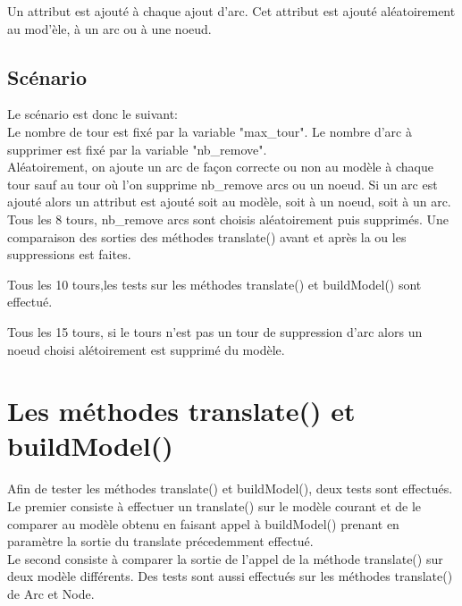 \documentclass{article}
\begin{document}
Un attribut est ajout\'e \`a chaque ajout d'arc.
Cet attribut est ajout\'e al\'eatoirement au mod'\`ele, \`a un arc ou \`a une noeud. 


\subsection{Sc\'enario}

Le sc\'enario est donc le suivant:\\

Le nombre de tour est fix\'e par la variable "max\_tour".
Le nombre d'arc \`a supprimer est fix\'e par la variable "nb\_remove".\\

Al\'eatoirement, on ajoute un arc de fa\c{c}on correcte ou non au mod\`ele \`a chaque tour sauf au tour 
o\`u l'on supprime nb\_remove arcs ou un noeud.
Si un arc est ajout\'e alors un attribut est ajout\'e soit au mod\`ele, soit \`a un noeud, soit \`a un arc.\\

Tous les 8 tours, nb\_remove arcs sont choisis al\'eatoirement puis supprim\'es.
Une comparaison des sorties des m\'ethodes translate() avant et apr\`es la ou les suppressions 
est faites.

Tous les 10 tours,les tests sur les m\'ethodes translate() et buildModel() sont effectu\'e.

Tous les 15 tours, si le tours n'est pas un tour de suppression d'arc alors un noeud choisi al\'etoirement est supprim\'e du mod\`ele.



\section{Les m\'ethodes translate() et buildModel()}

Afin de tester les m\'ethodes translate() et buildModel(), deux tests sont effectu\'es.\\

Le premier consiste \`a effectuer un translate() sur le mod\`ele courant et de le comparer 
au mod\`ele obtenu en faisant appel \`a buildModel() prenant en param\`etre
la sortie du translate pr\'ecedemment effectu\'e.\\

Le second consiste \`a comparer la sortie de l'appel de la m\'ethode translate() sur deux mod\`ele diff\'erents.
Des tests sont aussi effectu\'es sur les m\'ethodes translate() de Arc et Node.
\end{document}
